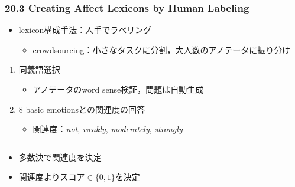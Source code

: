 
\begin{frame}
    \frametitle{20.3 Creating Affect Lexicons by Human Labeling}
    \begin{itemize}
        \item lexicon構成手法：人手でラベリング
        \begin{itemize}
            \item crowdsourcing：小さなタスクに分割，大人数のアノテータに振り分け
        \end{itemize}
    \end{itemize}
    \begin{enumerate}
        \item 同義語選択
        \begin{itemize}
            \item アノテータのword sense検証，問題は自動生成
        \end{itemize}
        \item 8 basic emotionsとの関連度の回答
        \begin{itemize}
            \item 関連度：\textit{not}, \textit{weakly}, \textit{moderately}, \textit{strongly}
        \end{itemize}
    \end{enumerate}
    \begin{columns}
        \begin{column}[T]{0.7\textwidth}
            \begin{itemize}
                \item 多数決で関連度を決定
                \item 関連度よりスコア$\in \{0, 1\}$を決定
                \begin{itemize}

\end{itemize}
\end{itemize}
\end{column}
\end{columns}
\end{frame}

